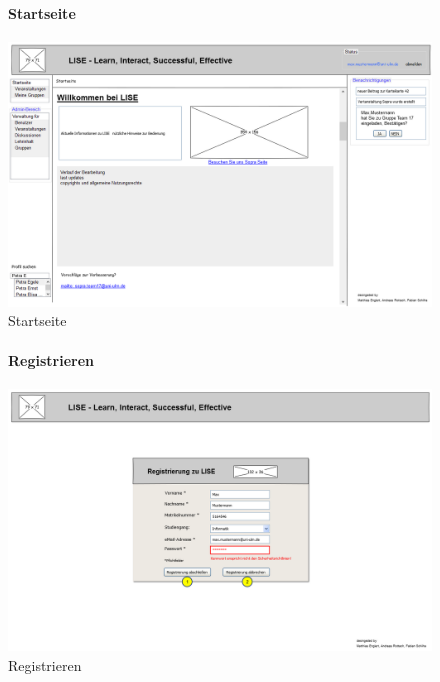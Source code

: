 \documentclass[12pt,a4paper]{article}
\begin{document}
{\begin{figure}[H]
	\paragraph{Startseite}
	\includegraphics[width=\textwidth]{Bilder/Mockups/GUI/Startseite.png}
	\caption{Startseite}
	\label{GuiStartseite}
\end{figure}

\begin{figure}[H]
	\centering
	\paragraph{Registrieren}
	\includegraphics[width=\textwidth]{Bilder/Mockups/GUI/Registrierung.png}
	\caption{Registrieren}
	\label{GuiRegistrieren}
\end{figure}

\begin{figure}[H]
	\centering

\end{figure}}
\end{document}
